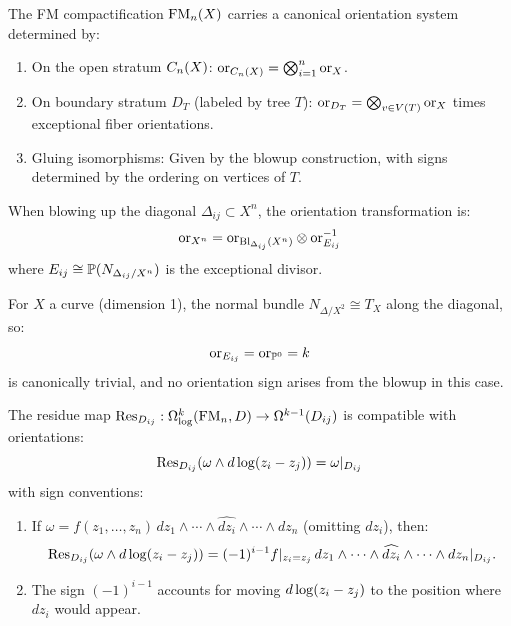 \begin{proposition}
\label{prop:orient-fm}
The FM compactification $\mathrm{FM}_n(X)$ carries a canonical orientation system 
determined by:
\begin{enumerate}[label=(\roman*)]
\item On the open stratum $C_n(X)$: $\mathrm{or}_{C_n(X)} = \bigotimes_{i=1}^n \mathrm{or}_{X}$.
\item On boundary stratum $D_T$ (labeled by tree $T$): 
$\mathrm{or}_{D_T} = \bigotimes_{v \in V(T)} \mathrm{or}_{X}$ times exceptional fiber orientations.
\item Gluing isomorphisms: Given by the blowup construction, with signs determined 
by the ordering on vertices of $T$.
\end{enumerate}
\end{proposition}

\begin{construction}
\label{constr:sign-blowup}
When blowing up the diagonal $\Delta_{ij} \subset X^n$, the orientation 
transformation is:
\[
\mathrm{or}_{X^n} = \mathrm{or}_{\operatorname{Bl}_{\Delta_{ij}}(X^n)} \otimes \mathrm{or}_{E_{ij}}^{-1}
\]
where $E_{ij} \cong \mathbb{P}(N_{\Delta_{ij}/X^n})$ is the exceptional divisor.

For $X$ a curve (dimension 1), the normal bundle $N_{\Delta/X^2} \cong T_X$ 
along the diagonal, so:
\[
\mathrm{or}_{E_{ij}} = \mathrm{or}_{\mathbb{P}^0} = k
\]
is canonically trivial, and no orientation sign arises from the blowup in this case.
\end{construction}

\begin{lemma}
\label{lem:residue-orient}
The residue map $\operatorname{Res}_{D_{ij}}: \Omega^k_{\log}(\mathrm{FM}_n, D) \to \Omega^{k-1}(D_{ij})$ 
is compatible with orientations:
\[
\operatorname{Res}_{D_{ij}}(\omega \wedge d\log(z_i - z_j)) = \omega|_{D_{ij}}
\]
with sign conventions:
\begin{enumerate}[label=(\roman*)]
\item If $\omega = f(z_1, \ldots, z_n) \, dz_1 \wedge \cdots \wedge \widehat{dz_i} \wedge \cdots \wedge dz_n$ 
(omitting $dz_i$), then:
\[
\operatorname{Res}_{D_{ij}}(\omega \wedge d\log(z_i - z_j)) = (-1)^{i-1} f|_{z_i = z_j} \, 
dz_1 \wedge \cdots \wedge \widehat{dz_i} \wedge \cdots \wedge dz_n|_{D_{ij}}.
\]
\item The sign $(-1)^{i-1}$ accounts for moving $d\log(z_i - z_j)$ to the position 
where $dz_i$ would appear.
\end{enumerate}
\end{lemma}
